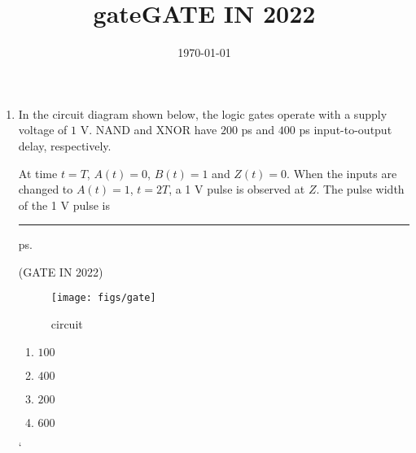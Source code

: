 \documentclass[12pt,-letter paper]{article}
\title{gate}
\date{\today}%
\begin{document}
\title{\textbf{GATE IN 2022}}

\maketitle
\begin{enumerate}
\item In the circuit diagram shown below, the logic gates operate with a supply voltage of $1$ V. NAND and XNOR have $200$ ps and $400$ ps input-to-output delay,
respectively.

At time $t = T$, $A(t) = 0 $, $B(t) = 1$ and $Z(t) = 0$. When the inputs are changed to $A(t) = 1$, $t = 2T$, a 1 V pulse is observed at $Z$. The pulse width of the 1 V pulse is \rule{30pt}{1pt} ps.


\hfill{(GATE IN 2022)}

  \begin{figure}[!ht]
	  \texttt{[image: figs/gate]}
         \caption{circuit}
   \label{figs:fig1}
  \end{figure}

\begin{enumerate}
\item $ 100 $
\item $ 400 $
\item $ 200 $ 
\item $ 600 $
\end{enumerate}`
\end{enumerate}
\end{document}

